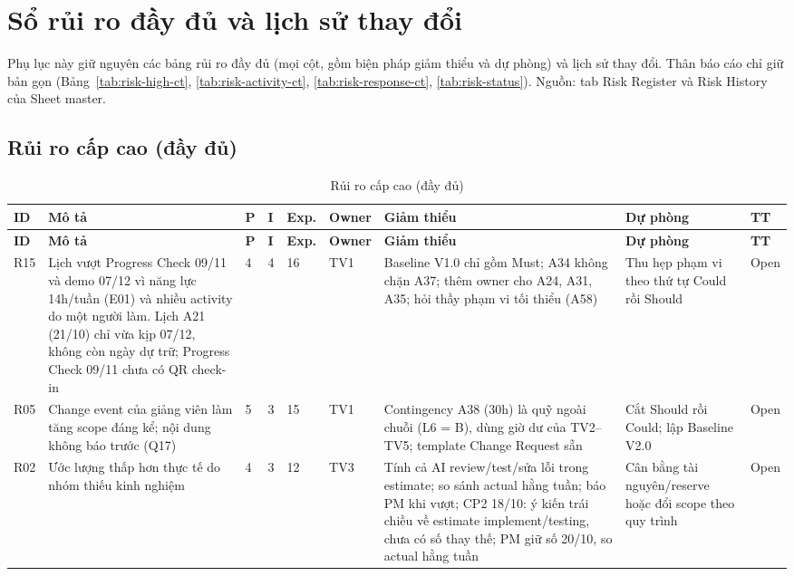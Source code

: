 \chapter{Sổ rủi ro đầy đủ và lịch sử thay đổi}
\label{app:risk}

Phụ lục này giữ nguyên các bảng rủi ro đầy đủ (mọi cột, gồm biện pháp giảm thiểu và dự phòng) và lịch sử thay đổi. Thân báo cáo chỉ giữ bản gọn (Bảng~\ref{tab:risk-high-ct}, \ref{tab:risk-activity-ct}, \ref{tab:risk-response-ct}, \ref{tab:risk-status}). Nguồn: tab Risk Register và Risk History của Sheet master.

\begin{landscape}
\section{Rủi ro cấp cao (đầy đủ)}
\begingroup\tblsetup\footnotesize\renewcommand{\arraystretch}{1.1}\tblzebra
\begin{longtable}{L{1.16cm}L{3.75cm}L{0.44cm}L{0.44cm}L{1.30cm}L{1.88cm}L{4.34cm}L{3.47cm}L{1.45cm}}
\caption{Rủi ro cấp cao (đầy đủ)}\label{tab:risk-high}\\
\toprule
{}\textbf{ID} & \textbf{Mô tả} & \textbf{P} & \textbf{I} & \textbf{Exp.} & \textbf{Owner} & \textbf{Giảm thiểu} & \textbf{Dự phòng} & \textbf{TT} \\
\midrule
\endfirsthead
\toprule
{}\textbf{ID} & \textbf{Mô tả} & \textbf{P} & \textbf{I} & \textbf{Exp.} & \textbf{Owner} & \textbf{Giảm thiểu} & \textbf{Dự phòng} & \textbf{TT} \\
\midrule
\endhead
\bottomrule
\endlastfoot
R15 & Lịch vượt Progress Check 09/11 và demo 07/12 vì năng lực 14h/tuần (E01) và nhiều activity do một người làm. Lịch A21 (21/10) chỉ vừa kịp 07/12, không còn ngày dự trữ; Progress Check 09/11 chưa có QR check-in & 4 & 4 & 16 & TV1 & Baseline V1.0 chỉ gồm Must; A34 không chặn A37; thêm owner cho A24, A31, A35; hỏi thầy phạm vi tối thiểu (A58) & Thu hẹp phạm vi theo thứ tự Could rồi Should & Open \\
R05 & Change event của giảng viên làm tăng scope đáng kể; nội dung không báo trước (Q17) & 5 & 3 & 15 & TV1 & Contingency A38 (30h) là quỹ ngoài chuỗi (L6 = B), dùng giờ dư của TV2--TV5; template Change Request sẵn & Cắt Should rồi Could; lập Baseline V2.0 & Open \\
R02 & Ước lượng thấp hơn thực tế do nhóm thiếu kinh nghiệm & 4 & 3 & 12 & TV3 & Tính cả AI review/test/sửa lỗi trong estimate; so sánh actual hằng tuần; báo PM khi vượt; CP2 18/10: ý kiến trái chiều về estimate implement/testing, chưa có số thay thế; PM giữ số 20/10, so actual hằng tuần & Cân bằng tài nguyên/reserve hoặc đổi scope theo quy trình & Open \\

\end{longtable}
\end{landscape}
